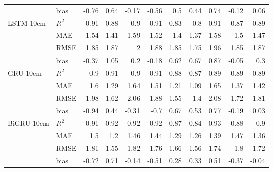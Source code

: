 \begin{tabular}{llrrrrrrrrr}
                                     & bias  & -0.76 &  0.64 & -0.17 & -0.56 & 0.5  &  0.44 & 0.74 & -0.12 &      0.06 \\
 LSTM 10cm                           & $R^2$ &  0.91 &  0.88 &  0.9  &  0.91 & 0.83 &  0.8  & 0.91 &  0.87 &      0.89 \\
                                     & MAE   &  1.54 &  1.41 &  1.59 &  1.52 & 1.4  &  1.37 & 1.58 &  1.5  &      1.47 \\
                                     & RMSE  &  1.85 &  1.87 &  2    &  1.88 & 1.85 &  1.75 & 1.96 &  1.85 &      1.87 \\
                                     & bias  & -0.37 &  1.05 &  0.2  & -0.18 & 0.62 &  0.67 & 0.87 & -0.05 &      0.3  \\
 GRU 10cm                            & $R^2$ &  0.9  &  0.91 &  0.9  &  0.91 & 0.88 &  0.87 & 0.89 &  0.89 &      0.89 \\
                                     & MAE   &  1.6  &  1.29 &  1.64 &  1.51 & 1.21 &  1.09 & 1.65 &  1.37 &      1.42 \\
                                     & RMSE  &  1.98 &  1.62 &  2.06 &  1.88 & 1.55 &  1.4  & 2.08 &  1.72 &      1.81 \\
                                     & bias  & -0.94 &  0.44 & -0.31 & -0.7  & 0.67 &  0.53 & 0.77 & -0.19 &      0.03 \\
 BiGRU 10cm                          & $R^2$ &  0.91 &  0.92 &  0.92 &  0.92 & 0.87 &  0.84 & 0.93 &  0.88 &      0.9  \\
                                     & MAE   &  1.5  &  1.2  &  1.46 &  1.44 & 1.29 &  1.26 & 1.39 &  1.47 &      1.36 \\
                                     & RMSE  &  1.81 &  1.55 &  1.82 &  1.76 & 1.66 &  1.56 & 1.74 &  1.8  &      1.72 \\
                                     & bias  & -0.72 &  0.71 & -0.14 & -0.51 & 0.28 &  0.33 & 0.51 & -0.37 &     -0.04 \\
\hline
\end{tabular}
